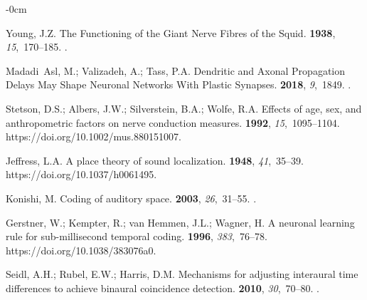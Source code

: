 \documentclass[brainsci, %
               review,accept,pdftex,moreauthors
               ]{Definitions/mdpi}
\begin{document}
\begin{adjustwidth}{-\extralength}{0cm}
\begin{thebibliography}{999}
Young, J.Z.
\newblock The {Functioning} of the {Giant} {Nerve} {Fibres} of the {Squid}.
 {\bf 1938}, {\em 15},~170--185.\linebreak
{}.

Madadi~Asl, M.; Valizadeh, A.; Tass, P.A.
\newblock Dendritic and {Axonal} {Propagation} {Delays} {May} {Shape}
  {Neuronal} {Networks} {With} {Plastic} {Synapses}.
 {\bf 2018}, {\em 9},~1849.
.

Stetson, D.S.; Albers, J.W.; Silverstein, B.A.; Wolfe, R.A.
\newblock Effects of age, sex, and anthropometric factors on nerve conduction
  measures.
 {\bf 1992}, {\em 15},~1095--1104.
  {{https://doi.org/10.1002/mus.880151007}}.

Jeffress, L.A.
\newblock A place theory of sound localization.
 {\bf 1948},
  {\em 41},~35--39.
  {{https://doi.org/10.1037/h0061495}}.

Konishi, M.
\newblock Coding of auditory space.
 {\bf 2003}, {\em 26},~31--55.\linebreak
{}.

Gerstner, W.; Kempter, R.; van Hemmen, J.L.; Wagner, H.
\newblock A neuronal learning rule for sub-millisecond temporal coding.
 {\bf 1996}, {\em 383},~76--78.
  {{https://doi.org/10.1038/383076a0}}.

Seidl, A.H.; Rubel, E.W.; Harris, D.M.
\newblock Mechanisms for adjusting interaural time differences to achieve
  binaural coincidence detection.
 {\bf 2010}, {\em 30},~70--80.
.


\end{thebibliography}
\end{adjustwidth}
\end{document}

